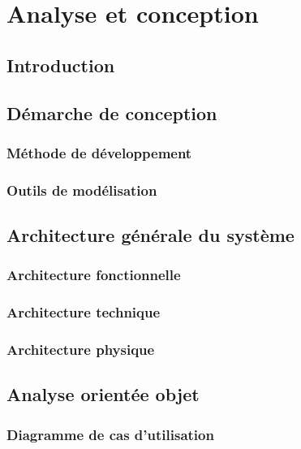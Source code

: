 \chapter{Analyse et conception}

\section{Introduction}

\section{Démarche de conception}

\subsection{Méthode de développement}

\subsection{Outils de modélisation}

\section{Architecture générale du système}

\subsection{Architecture fonctionnelle}

\subsection{Architecture technique}

\subsection{Architecture physique}

\section{Analyse orientée objet}

\subsection{Diagramme de cas d'utilisation}

